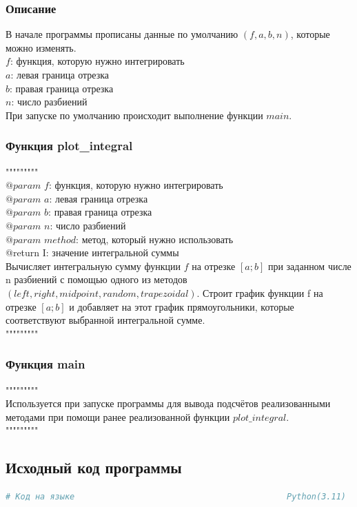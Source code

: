 \documentclass{article}
\begin{document}
\subsubsection*{Описание}
В начале программы прописаны данные по умолчанию $(f, a, b, n)$, которые можно изменять.\\
$f$: функция, которую нужно интегрировать\\
$a$: левая граница отрезка\\
$b$: правая граница отрезка\\
$n$: число разбиений\\
При запуске по умолчанию происходит выполнение функции $main$.
\subsubsection*{Функция plot\_integral}
"""$ $"""$ $"""\\
$@param$ $f$: функция, которую нужно интегрировать\\
$@param$ $a$: левая граница отрезка\\
$@param$ $b$: правая граница отрезка\\
$@param$ $n$: число разбиений\\
$@param$ $method$: метод, который нужно использовать\\
@return I: значение интегральной суммы\\
Вычисляет интегральную сумму функции $f$ на отрезке $[a; b]$
при заданном числе n разбиений
с помощью одного из методов $(left, right, midpoint, random, trapezoidal)$.
Строит график функции f на отрезке $[a; b]$ и добавляет на этот график прямоугольники, которые соответствуют выбранной интегральной сумме.\\
"""$ $"""$ $"""
\subsubsection*{Функция main}
"""$ $"""$ $"""\\
Используется при запуске программы для вывода подсчётов реализованными методами при помощи ранее реализованной функции $plot\_integral$.\\
"""$ $"""$ $"""\\
\subsection*{Исходный код программы}
\begin{lstlisting}[language=Python]
# Код на языке                                           Python(3.11)
\end{lstlisting}


\end{document}
